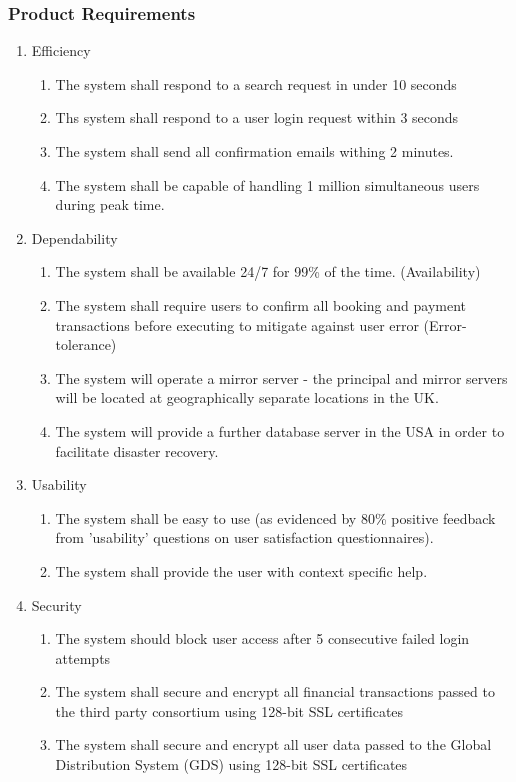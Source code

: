 \subsubsection{Product Requirements}
\begin{enumerate}
	\item Efficiency

		\begin{enumerate}
			\item The system shall respond to a search request in under 10 seconds
			\item Ths system shall respond to a user login request within 3 seconds
			\item The system shall send all confirmation emails withing 2 minutes.
			\item The system shall be capable of handling 1 million simultaneous users
				during peak time.
		\end{enumerate}
	\item Dependability

		\begin{enumerate}
			\item The system shall be available 24/7 for 99\% of the time. (Availability)
			\item The system shall require users to confirm all booking and payment
				transactions before executing to mitigate against user error (Error-tolerance)
			\item The system will operate a mirror server - the principal and mirror
				servers will be located at geographically separate locations in the
				UK.
			\item The system will provide a further database server in the USA in order
				to facilitate disaster recovery.
		\end{enumerate}
	\item Usability

		\begin{enumerate}
			\item The system shall be easy to use (as evidenced by 80\% positive feedback
				from 'usability' questions on user satisfaction questionnaires).
			\item The system shall provide the user with context specific help.
		\end{enumerate}
	\item Security

		\begin{enumerate}
			\item The system should block user access after 5 consecutive failed login
				attempts
			\item The system shall secure and encrypt all financial transactions passed
				to the third party consortium using 128-bit SSL certificates
			\item The system shall secure and encrypt all user data passed to the Global
				Distribution System (GDS) using 128-bit SSL certificates
		\end{enumerate}
\end{enumerate}

